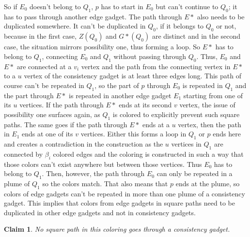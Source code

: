 \documentclass[12pt,a4paper]{article}
\newtheorem{claim}{Claim}
\begin{document}
So if $E_0$ doesn't belong to $Q_1$, $p$ has to start in $E_0$ but can't continue to $Q_0$; it has to pass through another edge gadget. The path through $E*$ also needs to be duplicated somewhere. It can't be duplicated in $Q_0$, if it belongs to $Q_0$ or not, because in the first case, $Z(Q_0)$ and $G*(Q_0)$ are distinct and in the second case, the situation mirrors possibility one, thus forming a loop. So $E*$ has to belong to $Q_1$, connecting $E_0$ and $Q_1$ without passing through $Q_0$. Thus, $E_0$ and $E*$ are connected at a $v_i$ vertex and the path from the connecting vertex in $E*$ to a $u$ vertex of the consistency gadget is at least three edges long. This path of course can't be repeated in $Q_1$, so the part of $p$ through $E_0$ is repeated in $Q_1$ and the part through $E*$ is repeated in another edge gadget $E_1$ starting from one of its $u$ vertices. If the path through $E*$ ends at its second $v$ vertex, the issue of possibility one surfaces again, as $Q_1$ is colored to explicitly prevent such square paths. The same goes if the path through $E*$ ends at a $u$ vertex, then the path in $E_1$ ends at one of its $v$ vertices. Either this forms a loop in $Q_1$ or $p$ ends here and creates a contradiction in the construction as the $u$ vertices in $Q_1$ are connected by $\beta_i$ colored edges and the coloring is constructed in such a way that those colors can't exist anywhere but between those vertices.
\newline
Thus $E_0$ has to belong to $Q_1$. Then, however, the path through $E_0$ can only be repeated in a plume of $Q_1$ so the colors match. That also means that $p$ ends at the plume, so colors of edge gadgets can't be repeated in more than one plume of a consistency gadget. This implies that colors from edge gadgets in square paths need to be duplicated in other edge gadgets and not in consistency gadgets.
  
\begin{claim}
No square path in this coloring goes through a consistency gadget.
\end{claim}
\end{document}

